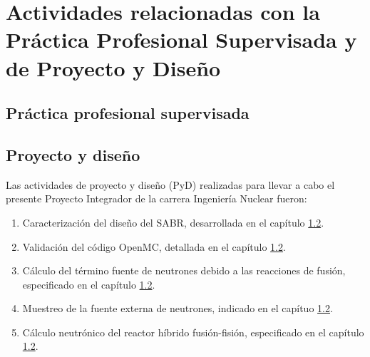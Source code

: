 \chapter{Actividades relacionadas con la Práctica Profesional Supervisada y de Proyecto y Diseño}\label{ap1}
\graphicspath{{figs/}}

\section{Práctica profesional supervisada}

\section{Proyecto y diseño}

Las actividades de proyecto y diseño (PyD) realizadas para llevar a cabo el presente Proyecto Integrador de la carrera Ingeniería Nuclear fueron:
\begin{enumerate}
	\item Caracterización del diseño del SABR, desarrollada en el capítulo \ref{}.
	\item Validación del código OpenMC, detallada en el capítulo \ref{}.
	\item Cálculo del término fuente de neutrones debido a las reacciones de fusión, especificado en el capítulo \ref{}.
	\item Muestreo de la fuente externa de neutrones, indicado en el capítuo \ref{}.
	\item Cálculo neutrónico del reactor híbrido fusión-fisión, especificado en el capítulo \ref{}.
\end{enumerate}
